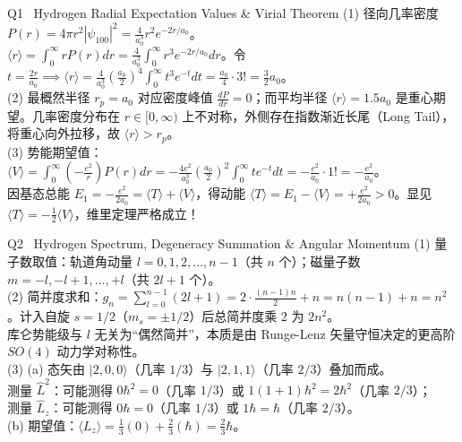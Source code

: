 \documentclass[a4paper,11pt]{article}
\begin{document}
\vspace{1.5pt}

\begin{solution}{Q1 \textperiodcentered\ Hydrogen Radial Expectation Values \& Virial Theorem}
\small
(1) 径向几率密度 $P(r) = 4\pi r^2 |\psi_{100}|^2 = \frac{4}{a_0^3} r^2 e^{-2r/a_0}$。\\
$\langle r \rangle = \int_0^\infty r P(r) dr = \frac{4}{a_0^3} \int_0^\infty r^3 e^{-2r/a_0} dr$。令 $t = \frac{2r}{a_0} \implies \langle r \rangle = \frac{4}{a_0^3} (\frac{a_0}{2})^4 \int_0^\infty t^3 e^{-t} dt = \frac{a_0}{4} \cdot 3! = \frac{3}{2}a_0$。\\
(2) 最概然半径 $r_p = a_0$ 对应密度峰值 $\frac{dP}{dr}=0$；而平均半径 $\langle r \rangle = 1.5 a_0$ 是重心期望。几率密度分布在 $r \in [0, \infty)$ 上不对称，外侧存在指数渐近长尾（Long Tail），将重心向外拉移，故 $\langle r \rangle > r_p$。\\
(3) 势能期望值：$\langle V \rangle = \int_0^\infty (-\frac{e^2}{r}) P(r) dr = -\frac{4e^2}{a_0^3} (\frac{a_0}{2})^2 \int_0^\infty t e^{-t} dt = -\frac{e^2}{a_0} \cdot 1! = -\frac{e^2}{a_0}$。\\
因基态总能 $E_1 = -\frac{e^2}{2a_0} = \langle T \rangle + \langle V \rangle$，得动能 $\langle T \rangle = E_1 - \langle V \rangle = +\frac{e^2}{2a_0} > 0$。显见 $\langle T \rangle = -\frac{1}{2}\langle V \rangle$，维里定理严格成立！
\end{solution}

\vspace{1.5pt}

\begin{solution}{Q2 \textperiodcentered\ Hydrogen Spectrum, Degeneracy Summation \& Angular Momentum}
\small
(1) 量子数取值：轨道角动量 $l = 0, 1, 2, \dots, n-1$（共 $n$ 个）；磁量子数 $m = -l, -l+1, \dots, +l$（共 $2l+1$ 个）。\\
(2) 简并度求和：$g_n = \sum_{l=0}^{n-1} (2l+1) = 2\cdot\frac{(n-1)n}{2} + n = n(n-1) + n = n^2$。计入自旋 $s=1/2$（$m_s = \pm 1/2$）后总简并度乘 2 为 $2n^2$。\\
库仑势能级与 $l$ 无关为“偶然简并”，本质是由 Runge-Lenz 矢量守恒决定的更高阶 $SO(4)$ 动力学对称性。\\
(3) (a) 态矢由 $|2,0,0\rangle$（几率 $1/3$）与 $|2,1,1\rangle$（几率 $2/3$）叠加而成。\\
测量 $\hat{L}^2$：可能测得 $0\hbar^2=0$（几率 $1/3$）或 $1(1+1)\hbar^2=2\hbar^2$（几率 $2/3$）；\\
测量 $\hat{L}_z$：可能测得 $0\hbar=0$（几率 $1/3$）或 $1\hbar=\hbar$（几率 $2/3$）。\\
(b) 期望值：$\langle L_z \rangle = \frac{1}{3}(0) + \frac{2}{3}(\hbar) = \frac{2}{3}\hbar$。
\end{solution}
\end{document}
